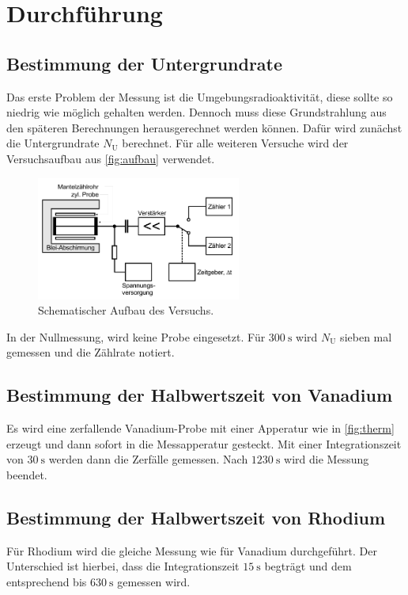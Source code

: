 \section{Durchführung}
\label{sec:Durchführung}


\subsection{Bestimmung der Untergrundrate}
\label{ssec:d1}

Das erste Problem der Messung ist die Umgebungsradioaktivität, diese sollte so niedrig wie möglich gehalten werden.
Dennoch muss diese Grundstrahlung aus den späteren Berechnungen herausgerechnet werden können. 
Dafür wird zunächst die Untergrundrate $N_\text{U}$ berechnet. 
Für alle weiteren Versuche wird der Versuchsaufbau aus \autoref{fig:aufbau} verwendet.

\begin{figure}
    \centering
    \includegraphics[width=0.6\textwidth]{images/bild3.png}
    \caption{Schematischer Aufbau des Versuchs.}
    \label{fig:aufbau}
\end{figure}

In der Nullmessung, wird keine Probe eingesetzt.
Für $\SI{300}{\second}$ wird $N_\text{U}$ sieben mal gemessen und die Zählrate notiert.

\subsection{Bestimmung der Halbwertszeit von Vanadium}
\label{ssec:d2}

Es wird eine zerfallende Vanadium-Probe mit einer Apperatur wie in \autoref{fig:therm} erzeugt und dann sofort in die Messapperatur gesteckt. 
Mit einer Integrationszeit von $\SI{30}{\second}$ werden dann die Zerfälle gemessen.
Nach $\SI{1230}{\second}$ wird die Messung beendet.

\subsection{Bestimmung der Halbwertszeit von Rhodium}
\label{ssec:d3}

Für Rhodium wird die gleiche Messung wie für Vanadium durchgeführt.
Der Unterschied ist hierbei, dass die Integrationszeit $\SI{15}{\second}$ begträgt und dem entsprechend bis $\SI{630}{\second}$ gemessen wird.